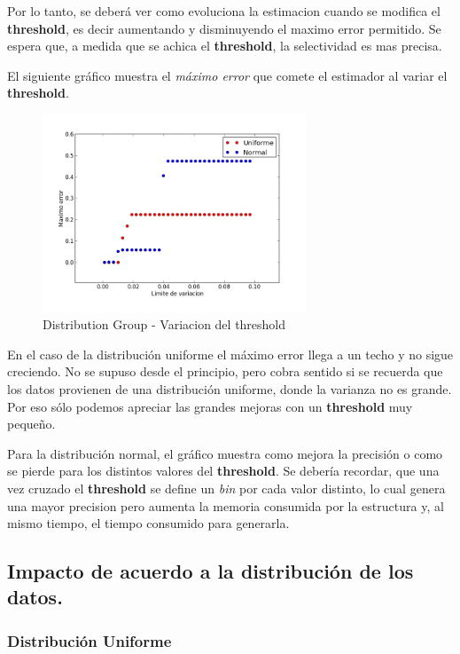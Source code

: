 \documentclass[10pt, a4paper,english,spanish,hidelinks]{article}
\begin{document}
{{Por lo tanto, se deberá ver como evoluciona la estimacion cuando se modifica el
\textbf{threshold}, es decir aumentando y disminuyendo el maximo error permitido.
Se espera que, a medida que se achica el \textbf{threshold}, la selectividad es mas precisa.

El siguiente gráfico muestra el \textit{máximo error} que comete el estimador
al variar el \textbf{threshold}.
\newpage
\begin{figure}
  \centering
  \includegraphics[width=0.7\textwidth]{./imagenes/ejb2_group_parameter_variation.png}
  \caption{Distribution Group - Variacion del threshold}
\end{figure}


En el caso de la distribución uniforme el máximo error llega a un
techo y no sigue creciendo. No se supuso desde el principio, pero cobra sentido si
se recuerda que los datos provienen de una distribución uniforme, donde la varianza no es
grande. Por eso sólo podemos apreciar las grandes mejoras con un \textbf{threshold} muy pequeño.

Para la distribución normal, el gráfico muestra como mejora la precisión o como se pierde
para los distintos valores del \textbf{threshold}. Se debería recordar, que una vez cruzado el
\textbf{threshold} se define un \textit{bin} por cada valor distinto, lo cual genera una mayor
precision pero aumenta la memoria consumida por la estructura y, al mismo tiempo, el tiempo
consumido para generarla.


\subsection{Impacto de acuerdo a la distribución de los datos.}
\subsubsection{Distribución Uniforme}

}}
\end{document}
